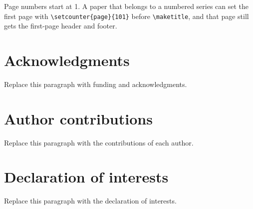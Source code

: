 Page numbers start at 1. A paper that belongs to a numbered series can set the first page with \texttt{\textbackslash setcounter\{page\}\{101\}} before \texttt{\textbackslash maketitle}, and that page still gets the first-page header and footer.

\section{Acknowledgments}

Replace this paragraph with funding and acknowledgments.

\section{Author contributions}

Replace this paragraph with the contributions of each author.

\section{Declaration of interests}

Replace this paragraph with the declaration of interests.


